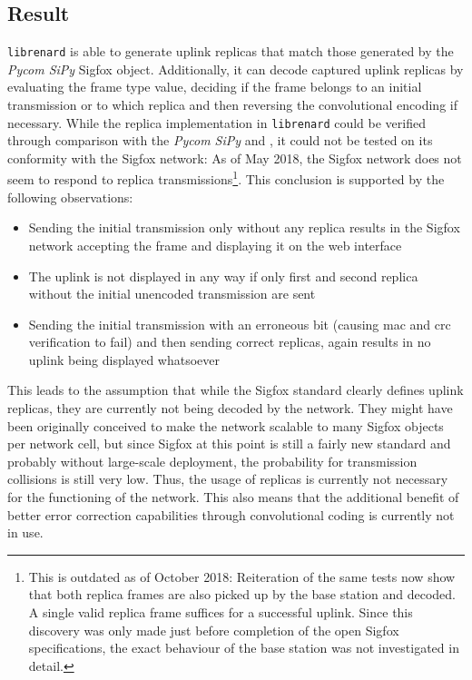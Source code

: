 \subsection{Result}
\texttt{librenard} is able to generate uplink replicas that match those generated by the \textit{Pycom SiPy} Sigfox object.
Additionally, it can decode captured uplink replicas by evaluating the frame type value, deciding if the frame belongs to an initial transmission or to which replica and then reversing the convolutional encoding if necessary.
While the replica implementation in \texttt{librenard} could be verified through comparison with the \textit{Pycom SiPy} and \cite{disk91radioprotocol}, it could not be tested on its conformity with the Sigfox network:
As of May 2018, the Sigfox network does not seem to respond to replica transmissions\footnote{This is outdated as of October 2018: Reiteration of the same tests now show that both replica frames are also picked up by the base station and decoded. A single valid replica frame suffices for a successful uplink. Since this discovery was only made just before completion of the open Sigfox specifications, the exact behaviour of the base station was not investigated in detail.}.
This conclusion is supported by the following observations:
\begin{itemize}
\item Sending the initial transmission only without any replica results in the Sigfox network accepting the frame and displaying it on the web interface
\item The uplink is not displayed in any way if only first and second replica without the initial unencoded transmission are sent
\item Sending the initial transmission with an erroneous bit (causing \gls{mac} and \gls{crc} verification to fail) and then sending correct replicas, again results in no uplink being displayed whatsoever
\end{itemize}
This leads to the assumption that while the Sigfox standard clearly defines uplink replicas, they are currently not being decoded by the network.
They might have been originally conceived to make the network scalable to many Sigfox objects per network cell, but since Sigfox at this point is still a fairly new standard and probably without large-scale deployment, the probability for transmission collisions is still very low.
Thus, the usage of replicas is currently not necessary for the functioning of the network.
This also means that the additional benefit of better error correction capabilities through convolutional coding is currently not in use.

